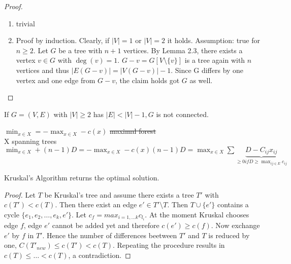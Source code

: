 \begin{proof}



	\begin{enumerate}
		\item trivial
		\item Proof by induction. Clearly, if $|V|=1$ or $|V|=2$ it holds. Assumption: true for $n \geq 2.$
		Let $G$ be a tree with $n+1$ vertices. By Lemma 2.3, there exists a vertex $v \in G$ with $\deg(v)=1$. $G-v=G[V\setminus \{v\}]$ is a tree again with $n$ vertices and thus $|E(G-v)|=|V(G-v)|-1$. Since G differs by one vertex and one edge from $G-v$, the claim holds got $G$ as well.
	\end{enumerate}
\end{proof}


\begin{lem}
If $G=(V,E)$ with $|V| \geq 2$ has $|E|< |V|-1, G$ is not connected.
\end{lem}

$\min_{x \in X} = -\max_{x \in X} -c(x)$ \sout{maximal forest}\\
X spanning trees\\
$\min_{x \in X} + (n-1)D= -\max_{x \in X} -c(x) (n-1)D =\max_{x\in X} \sum \underbrace{D-C_{ij}x_{ij}}_{\geq 0 if D \geq \max_{ij \in E} c_{ij}}$

\begin{thm}
Kruskal's Algorithm returns the optimal solution.
\end{thm}
\begin{proof}
Let $T$ be Kruskal's tree and assume there exists a tree $T'$ with $c(T') < c(T)$. Then there exist an edge $e' \in T'\setminus T$. Then $T \cup \{e'\} $ contains a cycle $\{e_1, e_2, \hdots, e_k, e'\}$. Let $ c_f=max_{i=1, \hdots k}c_{l_i} $. 
At the moment Kruskal chooses edge $f$, edge $e'$ cannot be added yet and therefore $c(e')\geq c(f)$. Now exchange $e'$ by $f$ in $T'$. Hence the number of differences beetween $T'$ and $T$ is reduced by one, $C(T'_{new})\leq c(T') < c(T)$. Repeating the procedure results in $c(T) \leq \hdots < c(T)$, a contradiction.
\end{proof}
